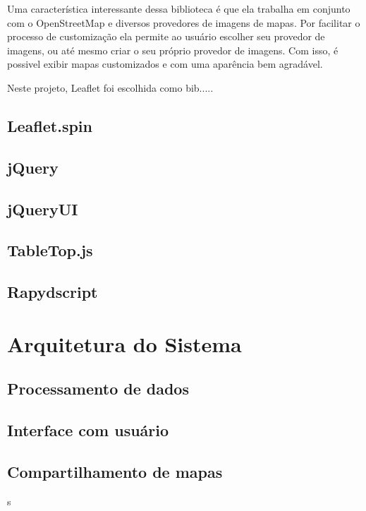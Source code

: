 Uma característica interessante dessa biblioteca é que ela trabalha em conjunto com o OpenStreetMap e diversos provedores de imagens de mapas. Por facilitar o processo de customização ela permite ao usuário escolher seu provedor de imagens, ou até mesmo criar o seu próprio provedor de imagens. Com isso, é possivel exibir mapas customizados e com uma aparência bem agradável.

Neste projeto, Leaflet foi escolhida como bib.....






































\subsection{Leaflet.spin}

\subsection{jQuery}
\subsection{jQueryUI}

\subsection{TableTop.js}

\subsection{Rapydscript}


\section{Arquitetura do Sistema}
\subsection{Processamento de dados}
\subsection{Interface com usuário} 
\subsection{Compartilhamento de mapas}
s